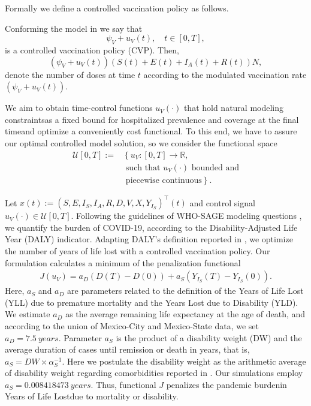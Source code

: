 Formally we define a controlled vaccination policy as follows.

\begin{definition}
    Conforming the model in  we say that
    $$
        \psi_V + u_V(t), \quad t \in [0, T],
    $$
    is a controlled vaccination policy (CVP). Then,
    $$
        (\psi_V + u_V (t))
        \left(
            S(t) + E(t) + I_A(t) + R(t)
        \right) N,
    $$
    denote the number of doses at time $t$ according to 
    the modulated vaccination rate $(\psi_V + u_V (t))$.
\end{definition}

    We aim to obtain time-control functions $u_V(\cdot)$ that hold natural 
modeling constraints\textemdash as a fixed bound for hospitalized 
prevalence and coverage at the final time\textemdash and optimize a 
conveniently cost functional. To this end, we have to assure our optimal controlled model solution, so we consider the functional space
\begin{equation}
    \label{eqn:picewise_continuous}
    \begin{aligned}
        \mathcal{U}[0,T] := &
        \left\{
            u_V: [0, T] \to \mathbb{R},
        \right.
            \\
            &
            \text{ such that $u_V(\cdot)$ bounded and}
            \\
            &
        \left.
            \text{ piecewise continuous}
        \right \}.
    \end{aligned}
\end{equation}

    Let ${x(t):= (S,E,I_S,I_A,R,D,V,X,Y_{I_S})^{\top}(t)}$
and control signal $u_V(\cdot)\in \mathcal{U}[0, T]$.
Following the guidelines of WHO-SAGE modeling questions \cite{sage2020},
we quantify the burden of COVID-19, according to the Disability-Adjusted Life 
Year (DALY) indicator. Adapting DALY's definition reported in 
\cite{WhoDALY}, we optimize the number of years of life lost with a 
controlled  vaccination policy. Our formulation 
calculates a minimum of the penalization functional 
%
\begin{align}
    \label{eqn:cost_functional}
    J(u_V) =
    a_D ( D(T) - D(0)) +
    a_S (Y_{I_S}(T) - Y_{I_S}(0)).
\end{align}
Here, $a_S$ and $a_D$ are parameters related to the definition of the Years of 
Life Lost (YLL) due to premature mortality and the Years Lost due to 
Disability (YLD). We estimate $a_D$ as the average remaining 
life expectancy at the age of
death, and according to the union of Mexico-City and Mexico-State data,
we set  $a_D = \SI{7.5}{years}$. Parameter $a_S$ is the product of a disability
weight (DW) and the average duration of cases until remission or death in years, that is,
$
a_S = DW \times \alpha_S^{-1}
$.
Here we postulate the disability weight as the arithmetic average of
disability weight regarding comorbidities reported in \cite{Jo2020}. Our
simulations employ $a_S= \SI{0.008418473}{years}$.
%
Thus, functional $J$ penalizes the pandemic burden\textemdash in Years
of Life Lost\textemdash due to mortality or disability. 

